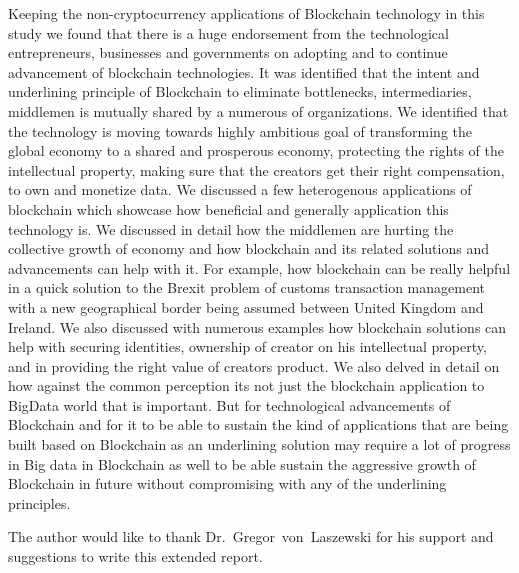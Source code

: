 Keeping the non-cryptocurrency applications of Blockchain technology
in this study we found that there is a huge endorsement from the
technological entrepreneurs, businesses and governments on adopting
and to continue advancement of blockchain technologies. It was
identified that the intent and underlining principle of Blockchain to
eliminate bottlenecks, intermediaries, middlemen is mutually shared by
a numerous of organizations. We identified that the technology is
moving towards highly ambitious goal of transforming the global
economy to a shared and prosperous economy, protecting the rights of
the intellectual property, making sure that the creators get their
right compensation, to own and monetize data. We discussed a few
heterogenous applications of blockchain which showcase how beneficial
and generally application this technology is. We discussed in detail
how the middlemen are hurting the collective growth of economy and how
blockchain and its related solutions and advancements can help with
it. For example, how blockchain can be really helpful in a quick
solution to the Brexit problem of customs transaction management with
a new geographical border being assumed between United Kingdom and
Ireland. We also discussed with numerous examples how blockchain
solutions can help with securing identities, ownership of creator on
his intellectual property, and in providing the right value of
creators product. We also delved in detail on how against the common
perception its not just the blockchain application to BigData world
that is important. But for technological advancements of Blockchain
and for it to be able to sustain the kind of applications that are
being built based on Blockchain as an underlining solution may require
a lot of progress in Big data in Blockchain as well to be able sustain
the aggressive growth of Blockchain in future without compromising
with any of the underlining principles.


\begin{acks}

The author would like to thank Dr.~Gregor~von~Laszewski for his
support and suggestions to write this extended report.

\end{acks}

\appendix

